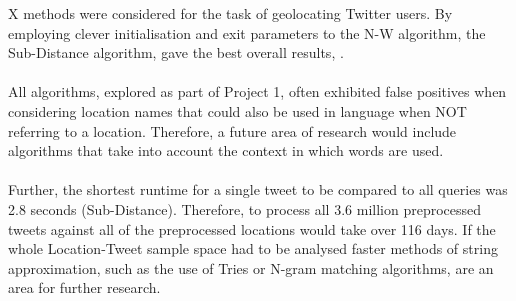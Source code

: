 \documentclass[11pt]{article}
\begin{document}
X methods were considered for the task of geolocating Twitter users. By employing clever initialisation and exit parameters to the N-W algorithm, the Sub-Distance algorithm, gave the best overall results, .\\\\
All algorithms, explored as part of Project 1, often exhibited false positives when considering location names that could also be used in language when NOT referring to a location. Therefore, a future area of research would include algorithms that take into account the context in which words are used.\\\\
Further, the shortest runtime for a single tweet to be compared to all queries was 2.8 seconds (Sub-Distance). Therefore, to process all 3.6 million preprocessed tweets against all of the preprocessed locations would take over 116 days. If the whole Location-Tweet sample space had to be analysed faster methods of string approximation, such as the use of Tries or N-gram matching algorithms, are an area for further research. 



\end{document}
